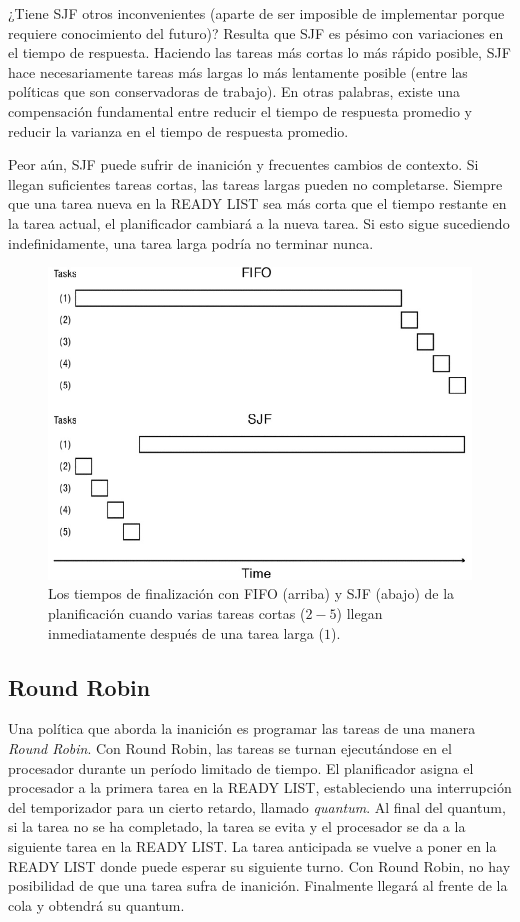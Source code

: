 \documentclass[10pt]{book}
\begin{document}
¿Tiene SJF otros inconvenientes (aparte de ser imposible de implementar porque requiere conocimiento del futuro)? Resulta que SJF es pésimo con variaciones en el tiempo de respuesta. Haciendo las tareas más cortas lo más rápido posible, SJF hace necesariamente tareas más largas lo más lentamente posible (entre las políticas que son conservadoras de trabajo). En otras palabras, existe una compensación fundamental entre reducir el tiempo de respuesta promedio y reducir la varianza en el tiempo de respuesta promedio.

Peor aún, SJF puede sufrir de inanición y frecuentes cambios de contexto. Si llegan suficientes tareas cortas, las tareas largas pueden no completarse. Siempre que una tarea nueva en la READY LIST sea más corta que el tiempo restante en la tarea actual, el planificador cambiará a la nueva tarea. Si esto sigue sucediendo indefinidamente, una tarea larga podría no terminar nunca.

\begin{figure}[tbhp]
\centerline{\includegraphics[scale=0.70]{img/fig0701}}
\caption{Los tiempos de finalización con FIFO (arriba) y SJF (abajo) de la planificación cuando varias tareas cortas ($2-5$) llegan inmediatamente después de una tarea larga ($1$).}
\label{fig0701}
\end{figure}

\subsection{Round Robin}
Una política que aborda la inanición es programar las tareas de una manera \textit{Round Robin}. Con Round Robin, las tareas se turnan ejecutándose en el procesador durante un período limitado de tiempo. El planificador asigna el procesador a la primera tarea en la READY LIST, estableciendo una interrupción del temporizador para un cierto retardo, llamado \textit{quantum}. Al final del quantum, si la tarea no se ha completado, la tarea se evita y el procesador se da a la siguiente tarea en la READY LIST. La tarea anticipada se vuelve a poner en la READY LIST donde puede esperar su siguiente turno. Con Round Robin, no hay posibilidad de que una tarea sufra de inanición. Finalmente llegará al frente de la cola y obtendrá su quantum.
\end{document}
